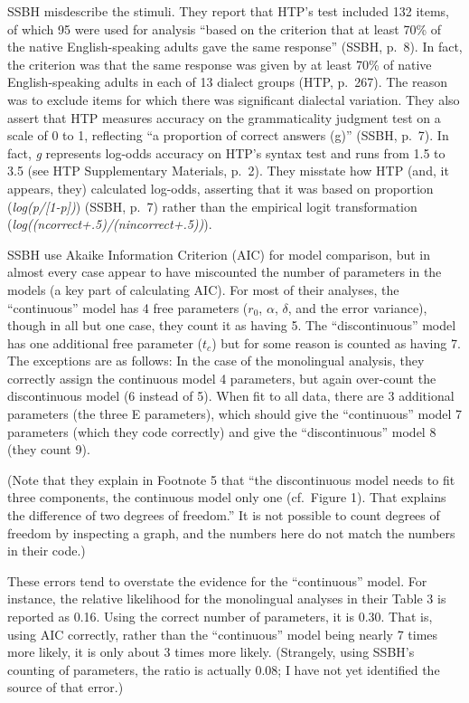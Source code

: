 \begin{appendix}
SSBH misdescribe the stimuli. They report that HTP's test included 132
items, of which 95 were used for analysis ``based on the criterion that
at least 70\% of the native English-speaking adults gave the same
response'' (SSBH, p.~8). In fact, the criterion was that the same
response was given by at least 70\% of native English-speaking adults in
each of 13 dialect groups (HTP, p.~267). The reason was to exclude items
for which there was significant dialectal variation. They also assert
that HTP measures accuracy on the grammaticality judgment test on a
scale of 0 to 1, reflecting ``a proportion of correct answers (g)''
(SSBH, p.~7). In fact, \emph{g} represents log-odds accuracy on HTP's
syntax test and runs from 1.5 to 3.5 (see HTP Supplementary Materials,
p.~2). They misstate how HTP (and, it appears, they) calculated
log-odds, asserting that it was based on proportion
(\emph{log(p/{[}1-p{]})}) (SSBH, p.~7) rather than the empirical logit
transformation (\emph{log((ncorrect+.5)/(nincorrect+.5))}).

SSBH use Akaike Information Criterion (AIC) for model comparison, but in
almost every case appear to have miscounted the number of parameters in
the models (a key part of calculating AIC). For most of their analyses,
the ``continuous'' model has 4 free parameters (\(r_0\), \(\alpha\),
\(\delta\), and the error variance), though in all but one case, they
count it as having 5. The ``discontinuous'' model has one additional
free parameter (\(t_c\)) but for some reason is counted as having 7. The
exceptions are as follows: In the case of the monolingual analysis, they
correctly assign the continuous model 4 parameters, but again over-count
the discontinuous model (6 instead of 5). When fit to all data, there
are 3 additional parameters (the three E parameters), which should give
the ``continuous'' model 7 parameters (which they code correctly) and
give the ``discontinuous'' model 8 (they count 9).

(Note that they explain in Footnote 5 that ``the discontinuous model
needs to fit three components, the continuous model only one (cf.~Figure
1). That explains the difference of two degrees of freedom.'' It is not
possible to count degrees of freedom by inspecting a graph, and the
numbers here do not match the numbers in their code.)

These errors tend to overstate the evidence for the ``continuous''
model. For instance, the relative likelihood for the monolingual
analyses in their Table 3 is reported as 0.16. Using the correct number
of parameters, it is 0.30. That is, using AIC correctly, rather than the
``continuous'' model being nearly 7 times more likely, it is only about
3 times more likely. (Strangely, using SSBH's counting of parameters,
the ratio is actually 0.08; I have not yet identified the source of that
error.)


\end{appendix}
